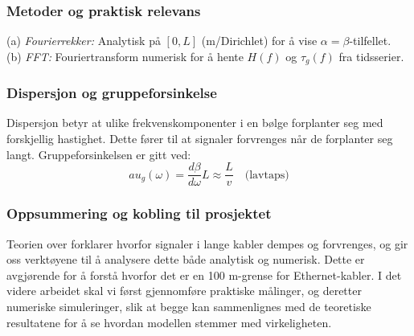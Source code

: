 \subsubsection{Metoder og praktisk relevans}

(a) \textit{Fourierrekker:} Analytisk på $[0,L]$ (m/Dirichlet) for å vise $\alpha=\beta$-tilfellet.\\
(b) \textit{FFT:} Fouriertransform numerisk for å hente $H(f)$ og $\tau_g(f)$ fra tidsserier.

\subsubsection{Dispersjon og gruppeforsinkelse}

Dispersjon betyr at ulike frekvenskomponenter i en bølge forplanter seg med forskjellig hastighet. Dette fører til at signaler forvrenges når de forplanter seg langt. Gruppeforsinkelsen er gitt ved:
\begin{equation}
	au_g(\omega) = \frac{d\beta}{d\omega} L \approx \frac{L}{v} \quad \text{(lavtaps)}
\end{equation}

\subsubsection{Oppsummering og kobling til prosjektet}

Teorien over forklarer hvorfor signaler i lange kabler dempes og forvrenges, og gir oss verktøyene til å analysere dette både analytisk og numerisk. Dette er avgjørende for å forstå hvorfor det er en 100 m-grense for Ethernet-kabler. I det videre arbeidet skal vi først gjennomføre praktiske målinger, og deretter numeriske simuleringer, slik at begge kan sammenlignes med de teoretiske resultatene for å se hvordan modellen stemmer med virkeligheten.





